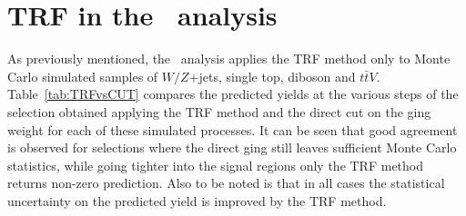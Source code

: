 \section{TRF in the \wbx\ analysis}

As previously mentioned, the \wbx\ analysis applies the
TRF method only to Monte Carlo simulated samples of
$W/Z$+jets, single top, diboson and $t\bar{t}V$.
Table~\ref{tab:TRFvsCUT} compares the predicted yields 
at the various steps of the selection obtained
applying the TRF method and the direct cut on the
\btag ging weight for each of these simulated
processes. It can be seen that good agreement
is observed for selections where the direct \btag ging
still leaves sufficient Monte Carlo statistics,
while going tighter into the signal regions only
the TRF method returns non-zero prediction.
Also to be noted is that in all cases
the statistical uncertainty on the predicted yield is
improved by the TRF method.


